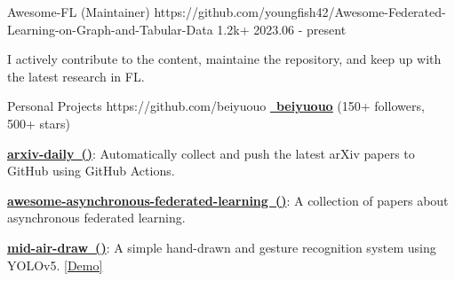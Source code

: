 \begin{cventries}

\cvproject
{Awesome-FL (Maintainer)} %
{https://github.com/youngfish42/Awesome-Federated-Learning-on-Graph-and-Tabular-Data}
{1.2k+} %
{2023.06 - present} %
{
\begin{cvitems} %
\item {I actively contribute to the content, maintaine the repository, and keep up with the latest research in FL. }
\end{cvitems}
} %





\cvproject
{Personal Projects} %
{https://github.com/beiyuouo} %
{} %
{\href{https://github.com/beiyuouo}{\textcolor{text}{\faGithub~\textbf{\underline{beiyuouo}}}} (150+ followers, 500+ stars)} %
{
\begin{cvitems} %
\item {\href{https://github.com/beiyuouo/arxiv-daily}{\textbf{arxiv-daily~()}}: Automatically collect and push the latest arXiv papers to GitHub using GitHub Actions.}
\item {\href{https://github.com/beiyuouo/awesome-asynchronous-federated-learning}{\textbf{awesome-asynchronous-federated-learning~()}}: A collection of papers about asynchronous federated learning.}
\item {\href{https://github.com/beiyuouo/mid-air-draw}{\textbf{mid-air-draw~()}}: A simple hand-drawn and gesture recognition system using YOLOv5. \textcolor{awesome-red}{\href{https://www.bilibili.com/video/BV15V411a7WB/}{[Demo]}}}
\end{cvitems}
} %


\end{cventries}

\clearpage